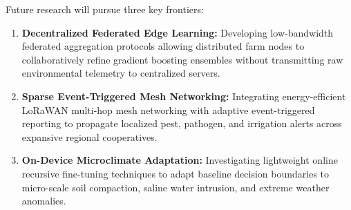 Future research will pursue three key frontiers:
\begin{enumerate}
    \item \textbf{Decentralized Federated Edge Learning:} Developing low-bandwidth federated aggregation protocols allowing distributed farm nodes to collaboratively refine gradient boosting ensembles without transmitting raw environmental telemetry to centralized servers.
    \item \textbf{Sparse Event-Triggered Mesh Networking:} Integrating energy-efficient LoRaWAN multi-hop mesh networking with adaptive event-triggered reporting to propagate localized pest, pathogen, and irrigation alerts across expansive regional cooperatives.
    \item \textbf{On-Device Microclimate Adaptation:} Investigating lightweight online recursive fine-tuning techniques to adapt baseline decision boundaries to micro-scale soil compaction, saline water intrusion, and extreme weather anomalies.
\end{enumerate}
